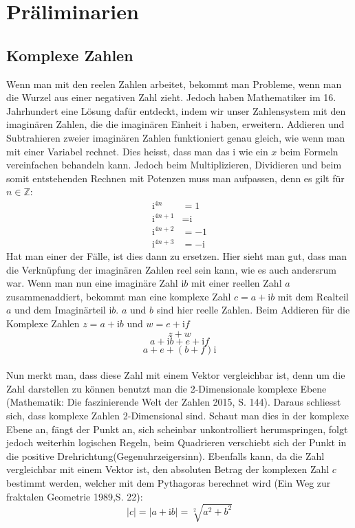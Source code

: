 \section{Präliminarien}
\subsection{Komplexe Zahlen}
Wenn man mit den reelen Zahlen arbeitet, bekommt man Probleme, wenn man die Wurzel aus einer negativen Zahl zieht. Jedoch haben Mathematiker im 16. Jahrhundert eine Lösung dafür entdeckt, indem wir unser Zahlensystem mit den imaginären Zahlen, die die imaginären Einheit i haben, erweitern. Addieren und Subtrahieren zweier imaginären Zahlen funktioniert genau gleich, wie wenn man mit einer Variabel rechnet. Dies heisst, dass man das i wie ein $x$ beim Formeln vereinfachen behandeln kann. Jedoch beim Multiplizieren, Dividieren und beim somit entstehenden Rechnen mit Potenzen muss man aufpassen, denn es gilt für $n \in \mathbb{Z}$:
\begin{align*}
 \text{i}^{4n} &= 1 \\
\text{i}^{4n+1} &= \text{i} \\
\text{i}^{4n+2} &= -1 \\
\text{i}^{4n+3} &= -\text{i} 
\end{align*}
Hat man einer der Fälle, ist dies dann zu ersetzen. Hier sieht man gut, dass man die Verknüpfung der imaginären Zahlen reel sein kann, wie es auch andersrum war. Wenn man nun eine imaginäre Zahl $\text{i}b$ mit einer reellen Zahl $a$ zusammenaddiert, bekommt man eine komplexe Zahl  $c=a+\text{i}b$ mit dem Realteil $a$ und dem Imaginärteil $\text{i}b$. $a$ und $b$ sind hier reelle Zahlen. Beim Addieren für die Komplexe Zahlen $z=a+\text{i}b$ und $w=e+\text{i}f$
\[z+w\]
\[a+\text{i}b+e+\text{i}f\]
\[a+e+(b+f)\text{i}\]
\\
Nun merkt man, dass diese Zahl mit einem Vektor vergleichbar ist, denn um die Zahl darstellen zu können benutzt man die 2-Dimensionale komplexe Ebene (Mathematik: Die faszinierende Welt der Zahlen 2015, S. 144). Daraus schliesst sich, dass komplexe Zahlen 2-Dimensional sind. Schaut man dies in der komplexe Ebene an, fängt der Punkt an, sich scheinbar unkontrolliert herumspringen, folgt jedoch weiterhin logischen Regeln, beim Quadrieren verschiebt sich der Punkt in die positive Drehrichtung(Gegenuhrzeigersinn). Ebenfalls kann, da die Zahl vergleichbar mit einem Vektor ist, den absoluten Betrag der komplexen Zahl $c$ bestimmt werden, welcher mit dem Pythagoras berechnet wird (Ein Weg zur fraktalen Geometrie 1989,S. 22):
\[|c| = |a+\text{i}b| = \sqrt[2]{a^2+b^2}\]

